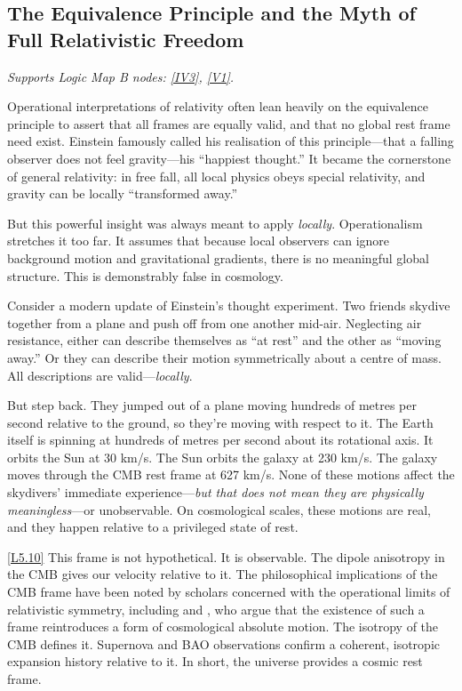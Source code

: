 \documentclass[12pt]{book}
\newcounter{logicanchor}
\newenvironment{logicanchorenv}[1]{\refstepcounter{logicanchor}\label{#1}}{}
\newcommand{\logiclink}[2]{\begin{logicanchorenv}{logic:#1}\end{logicanchorenv}\hyperref[appendix:#1]{[#1]}\xspace}
\begin{document}
\subsection{The Equivalence Principle and the Myth of Full Relativistic Freedom}\label{sec:5.3.2}
\noindent\textit{Supports Logic Map B nodes: \hyperref[appendix:IV3]{[IV3]}, \hyperref[appendix:V1]{[V1]}.}

\vspace{4pt}

Operational interpretations of relativity often lean heavily on the equivalence principle to assert that all frames are equally valid, and that no global rest frame need exist. Einstein famously called his realisation of this principle---that a falling observer does not feel gravity---his ``happiest thought.'' It became the cornerstone of general relativity: in free fall, all local physics obeys special relativity, and gravity can be locally ``transformed away.''

But this powerful insight was always meant to apply \textit{locally}. Operationalism stretches it too far. It assumes that because local observers can ignore background motion and gravitational gradients, there is no meaningful global structure. This is demonstrably false in cosmology.

Consider a modern update of Einstein's thought experiment. Two friends skydive together from a plane and push off from one another mid-air. Neglecting air resistance, either can describe themselves as ``at rest'' and the other as ``moving away.'' Or they can describe their motion symmetrically about a centre of mass. All descriptions are valid---\textit{locally}.

But step back. They jumped out of a plane moving hundreds of metres per second relative to the ground, so they're moving with respect to it. The Earth itself is spinning at hundreds of metres per second about its rotational axis. It orbits the Sun at 30 km/s. The Sun orbits the galaxy at 230 km/s. The galaxy moves through the CMB rest frame at 627 km/s. None of these motions affect the skydivers' immediate experience---\textit{but that does not mean they are physically meaningless}---or unobservable. On cosmological scales, these motions are real, and they happen relative to a privileged state of rest.

\logiclink{L5.10}{} This frame is not hypothetical. It is observable. The dipole anisotropy in the CMB gives our velocity relative to it. The philosophical implications of the CMB frame have been noted by scholars concerned with the operational limits of relativistic symmetry, including \citet{Ellis2008} and \citet{Rugh2009}, who argue that the existence of such a frame reintroduces a form of cosmological absolute motion. The isotropy of the CMB defines it. Supernova and BAO observations confirm a coherent, isotropic expansion history relative to it. In short, the universe provides a cosmic rest frame.
\end{document}
